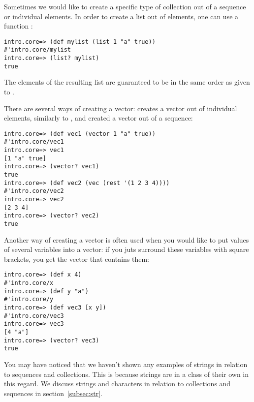Sometimes we would like to create a specific type of collection out of a sequence or individual elements. In order to create a list out of elements, one can use a function :
\begin{framed}
\begin{verbatim}
intro.core=> (def mylist (list 1 "a" true))
#'intro.core/mylist
intro.core=> (list? mylist)
true
\end{verbatim}
\end{framed} 
The elements of the resulting list are guaranteed to be in the same order as given to . 

There are several ways of creating a vector:  creates a vector out of individual elements, similarly to , and  created a vector out of a sequence:
\begin{framed}
\begin{verbatim}
intro.core=> (def vec1 (vector 1 "a" true))
#'intro.core/vec1
intro.core=> vec1
[1 "a" true]
intro.core=> (vector? vec1)
true
intro.core=> (def vec2 (vec (rest '(1 2 3 4))))
#'intro.core/vec2
intro.core=> vec2
[2 3 4]
intro.core=> (vector? vec2)
true
\end{verbatim}
\end{framed} 
Another way of creating a vector is often used when you would like to put values of several variables into a vector: if you juts surround these variables with square brackets, you get the vector that contains them:
\begin{framed}
\begin{verbatim}
intro.core=> (def x 4)
#'intro.core/x
intro.core=> (def y "a")
#'intro.core/y
intro.core=> (def vec3 [x y])
#'intro.core/vec3
intro.core=> vec3
[4 "a"]
intro.core=> (vector? vec3)
true
\end{verbatim}
\end{framed} 

You may have noticed that we haven't shown any examples of strings in relation to sequences and collections. This is because strings are in a class of their own in this regard. We discuss strings and characters in relation to collections and sequences in section~\ref{subsec:str}.





